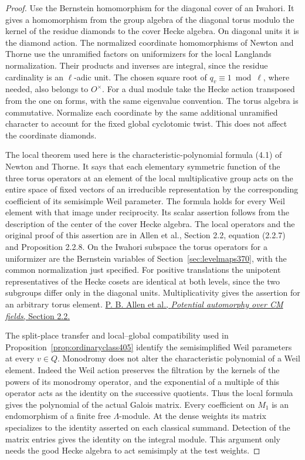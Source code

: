 \documentclass[a4paper,11pt]{article}
\theoremstyle{definition}
\theoremstyle{remark}
\numberwithin{equation}{section}
\begin{document}
\begin{proof}
Use the Bernstein homomorphism for the diagonal cover of an
Iwahori. It gives a homomorphism from the group algebra of
the diagonal torus modulo the kernel of the residue diamonds
to the cover Hecke algebra. On diagonal units it is the
diamond action. The normalized coordinate homomorphisms of
Newton and Thorne use the unramified factors on uniformizers
for the local Langlands normalization. Their products and
inverses are integral, since the residue cardinality is an
\(\ell\)-adic unit. The chosen square root of \(q_v\equiv1\bmod
\ell\), where needed, also belongs to \(O^\times\).
For a dual module take the Hecke action transposed from the
one on forms, with the same eigenvalue convention. The
torus algebra is commutative. Normalize each coordinate by
the same additional unramified character to account for the
fixed global cyclotomic twist. This does not affect the
coordinate diamonds.

The local theorem used here is the characteristic-polynomial
formula (4.1) of Newton and Thorne. It says that each elementary
symmetric function of the three torus operators at an element
of the local multiplicative group acts on the entire space
of fixed vectors of an irreducible representation by the
corresponding coefficient of its semisimple Weil parameter.
The formula holds for every Weil element with that image under
reciprocity. Its scalar assertion follows from the description
of the center of the cover Hecke algebra. The local operators
and the original proof of this assertion are in Allen et al.,
Section 2.2, equation (2.2.7) and Proposition 2.2.8. On the
Iwahori subspace the torus operators for a uniformizer are
the Bernstein variables of Section~\ref{sec:levelmaps370},
with the common normalization just specified. For positive
translations the unipotent representatives of the Hecke
cosets are identical at both levels, since the two subgroups
differ only in the diagonal units. Multiplicativity gives
the assertion for an arbitrary torus element.
\cite{VIII-VI-VI-nt119}
\href{https://arxiv.org/pdf/1812.09999}{P. B. Allen et al.,
\emph{Potential automorphy over CM fields}, Section 2.2.}

The split-place transfer and local--global compatibility used
in Proposition~\ref{prop:ordinaryclass405} identify the
semisimplified Weil parameters at every \(v\in Q\).
Monodromy does not alter the characteristic polynomial of
a Weil element. Indeed the Weil action preserves the
filtration by the kernels of the powers of its monodromy
operator, and the exponential of a multiple of this operator
acts as the identity on the successive quotients. Thus the
local formula gives the polynomial of the actual Galois
matrix. Every coefficient on \(M_1\) is an endomorphism of
a finite free \(\Lambda\)-module. At the dense weights its
matrix specializes to the identity asserted on each classical
summand. Detection of the matrix entries gives the identity
on the integral module. This argument only needs the good
Hecke algebra to act semisimply at the test weights.
\end{proof}
\end{document}

